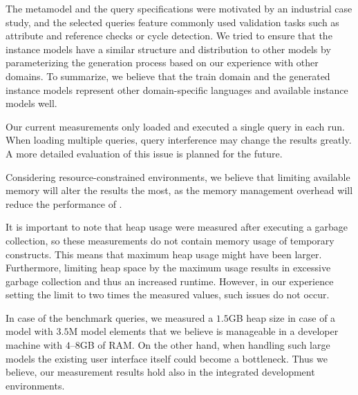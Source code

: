 The metamodel and the query specifications were motivated by an industrial case
study, and the selected queries feature commonly used validation tasks such as
attribute and reference checks or cycle detection. We tried to ensure that the
instance models have a similar structure and distribution to other models by
parameterizing the generation process based on our experience with other
domains. To summarize, we believe that the train domain and the generated
instance models represent other domain-specific languages and available instance
models well.

Our current measurements only loaded and executed a single query in each run.
When loading multiple queries, query interference may change the results
greatly. A more detailed evaluation of this issue is planned for the future.

Considering resource-constrained environments, we believe that limiting
available memory will alter the results the most, as the memory management
overhead will reduce the performance of \eiq{}.

It is important to note that heap usage were measured after executing a garbage
collection, so these measurements do not contain memory usage of temporary
constructs. This means that maximum heap usage might have been larger. Furthermore,
limiting heap space by the maximum usage results in excessive garbage collection
and thus an increased runtime. However, in our experience setting the limit to
two times the measured values, such issues do not occur.

In case of the benchmark queries, we measured a $1.5$GB heap size in case of a
model with $3.5$M model elements that we believe is manageable in a developer
machine with $4$--$8$GB of RAM. On the other hand, when handling such large
models the existing user interface itself could become a bottleneck. Thus we
believe, our measurement results hold also in the integrated development
environments.
